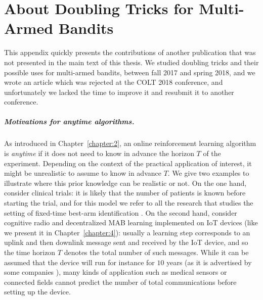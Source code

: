 \chapter{About Doubling Tricks for Multi-Armed Bandits}
\label{app:2:DoublingTricks}

This appendix quickly presents the contributions of another publication that was not presented in the main text of this thesis.
We studied doubling tricks and their possible uses for multi-armed bandits, between fall 2017 and spring 2018, and we wrote an article \cite{Besson2018DoublingTricks} which was rejected at the COLT 2018 conference, and unfortunately we lacked the time to improve it and resubmit it to another conference.




\paragraph{Motivations for anytime algorithms.}
%
As introduced in Chapter~\ref{chapter:2},
an online reinforcement learning algorithm is \emph{anytime} if it does not need to know in advance the horizon $T$ of the experiment.
%
Depending on the context of the practical application of interest, it might be unrealistic to assume to know in advance $T$. We give two examples to illustrate where this prior knowledge can be realistic or not.
On the one hand, consider clinical trials: it is likely that the number of patients is known before starting the trial, and for this model we refer to all the research that studies the setting of fixed-time best-arm identification \cite{audibert2010best,Garivier16BAI}.
On the second hand, consider cognitive radio and decentralized MAB learning implemented on IoT devices (like we present it in Chapter~\ref{chapter:4}): usually a learning step corresponds to an uplink and then downlink message sent and received by the IoT device, and so the time horizon $T$ denotes the total number of such messages. While it can be assumed that the device will run for instance for $10$ years (as it is advertised by some companies \cite{Centenaro16}), many kinds of application such as medical sensors or connected fields cannot predict the number of total communications before setting up the device.

